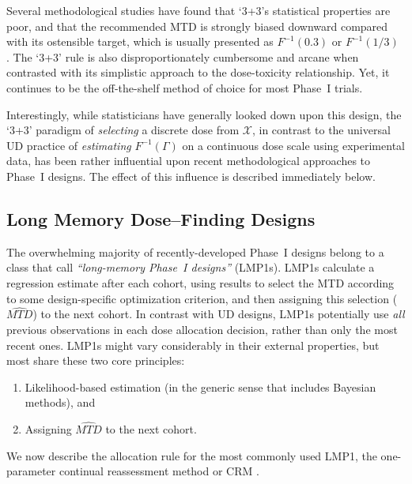 Several methodological studies have found that `3+3's statistical properties are poor, and that the recommended MTD is strongly biased downward compared with its ostensible target, which is usually presented as $F^{-1}(0.3)$ or $F^{-1}(1/3)$ \citep{Rein:Paol:O'Qu:oper:1999,Lin:Shih:stat:2001}. The `3+3' rule is also disproportionately cumbersome and arcane when contrasted with its simplistic approach to the dose-toxicity relationship. Yet, it continues to be the off-the-shelf method of choice for most Phase~I trials.

Interestingly, while statisticians have generally looked down upon this design, the `3+3' paradigm of \emph{selecting} a discrete dose from $\mathcal{X}$, in contrast to the universal UD practice of \emph{estimating} $F^{-1}(\Gamma)$ on a continuous dose scale using experimental data, has been rather influential upon recent methodological approaches to Phase~I designs. The effect of this influence is described immediately below.

\subsection{Long Memory Dose--Finding Designs}

The overwhelming majority of recently-developed Phase~I designs belong to a class that \cite{Oron:Hoff:smal:2013} call \emph{``long-memory Phase~I designs''} (LMP1s). LMP1s calculate a regression estimate after each cohort, using results to select the MTD according to some design-specific optimization criterion, and then assigning this selection ($\widehat{MTD}$) to the next cohort. In contrast with UD designs, LMP1s potentially use \emph{all} previous observations in each dose allocation decision, rather than only the most recent ones. LMP1s might vary considerably in their external properties, but most share these two core principles:
\begin{enumerate}
\item Likelihood-based estimation (in the generic sense that includes Bayesian methods), and
\item Assigning  $\widehat{MTD}$ to the next cohort.
\end{enumerate}
We now describe the allocation rule for the most commonly used LMP1, the one-parameter continual reassessment method or CRM \citep{O'Qu:Pepe:Fish:cont:1990}.

